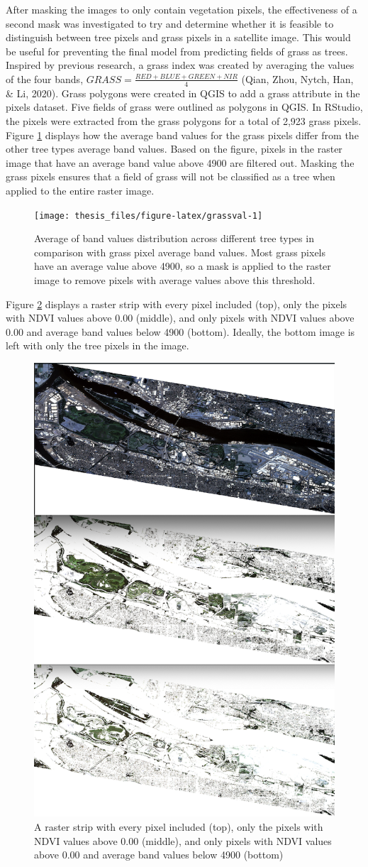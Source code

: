 \documentclass[12pt,twoside]{reedthesis}
\begin{document}
After masking the images to only contain vegetation pixels, the effectiveness of a second mask was investigated to try and determine whether it is feasible to distinguish between tree pixels and grass pixels in a satellite image. This would be useful for preventing the final model from predicting fields of grass as trees. Inspired by previous research, a grass index was created by averaging the values of the four bands, \(GRASS = \frac{RED + BLUE + GREEN + NIR}{4}\) (Qian, Zhou, Nytch, Han, \& Li, 2020). Grass polygons were created in QGIS to add a grass attribute in the pixels dataset. Five fields of grass were outlined as polygons in QGIS. In RStudio, the pixels were extracted from the grass polygons for a total of 2,923 grass pixels. Figure \ref{fig:grassval} displays how the average band values for the grass pixels differ from the other tree types average band values. Based on the figure, pixels in the raster image that have an average band value above 4900 are filtered out. Masking the grass pixels ensures that a field of grass will not be classified as a tree when applied to the entire raster image.
\begin{figure}

{\centering \texttt{[image: thesis\_files/figure-latex/grassval-1]} 

}

\caption{Average of band values distribution across different tree types in comparison with grass pixel average band values. Most grass pixels have an average value above 4900, so a mask is applied to the raster image to remove pixels with average values above this threshold.}\label{fig:grassval}
\end{figure}
Figure \ref{fig:beforeaftermask} displays a raster strip with every pixel included (top), only the pixels with NDVI values above 0.00 (middle), and only pixels with NDVI values above 0.00 and average band values below 4900 (bottom). Ideally, the bottom image is left with only the tree pixels in the image.
\begin{figure}

{\centering \includegraphics[width=0.4\linewidth]{figure/beforeaftermask} 

}

\caption{A raster strip with every pixel included (top), only the pixels with NDVI values above 0.00 (middle), and only pixels with NDVI values above 0.00 and average band values below 4900 (bottom)}\label{fig:beforeaftermask}
\end{figure}
\end{document}
